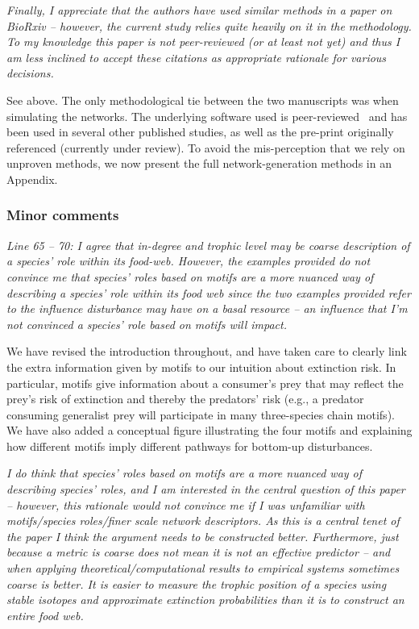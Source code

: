 \documentclass[12pt]{article}
\newcommand{\us}{\rm \setlength{\leftskip}{0.3cm} \setlength{\rightskip}{0.3cm}}
\newcommand{\them}{\it \setlength{\leftskip}{0cm} \setlength{\rightskip}{0cm}}
\begin{document}
        
        \them
        Finally, I appreciate that the authors have used similar methods in a paper on BioRxiv – however, the current study relies quite heavily on it in the methodology. To my knowledge this paper is not peer-reviewed (or at least not yet) and thus I am less inclined to accept these citations as appropriate rationale for various decisions.
        
        \us See above. The only methodological tie between the two manuscripts was when simulating the networks. The underlying software used is peer-reviewed~\citep{Delmas2017} and has been used in several other published studies, as well as the pre-print originally referenced (currently under review). To avoid the mis-perception that we rely on unproven methods, we now present the full network-generation methods in an Appendix.

    \subsubsection*{Minor comments}
        
        \them
        Line 65 – 70: I agree that in-degree and trophic level may be coarse description of a species’ role within its food-web. However, the examples provided do not convince me that species’ roles based on motifs are a more nuanced way of describing a species’ role within its food web since the two examples provided refer to the influence disturbance may have on a basal resource – an influence that I’m not convinced a species’ role based on motifs will impact.  
        
        
        \us
        We have revised the introduction throughout, and have taken care to clearly link the extra information given by motifs to our intuition about extinction risk. In particular, motifs give information about a consumer's prey that may reflect the prey's risk of extinction and thereby the predators' risk (e.g., a predator consuming generalist prey will participate in many three-species chain motifs). We have also added a conceptual figure illustrating the four motifs and explaining how different motifs imply different pathways for bottom-up disturbances.
        
        
        \them
        I do think that species’ roles based on motifs are a more nuanced way of describing species’ roles, and I am interested in the central question of this paper – however, this rationale would not convince me if I was unfamiliar with motifs/species roles/finer scale network descriptors.  As this is a central tenet of the paper I think the argument needs to be constructed better. Furthermore, just because a metric is coarse does not mean it is not an effective predictor – and when applying theoretical/computational results to empirical systems sometimes coarse is better. It is easier to measure the trophic position of a species using stable isotopes and approximate extinction probabilities than it is to construct an entire food web.
        
\end{document}
